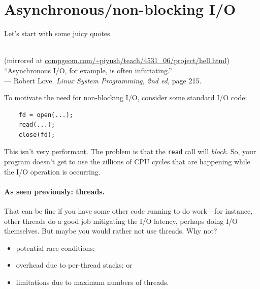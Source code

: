 




\section*{Asynchronous/non-blocking I/O}

Let's start with some juicy quotes.

\begin{center}
  \\
{\scriptsize (mirrored at \url{compgeom.com/~piyush/teach/4531_06/project/hell.html})}
   \\[2em]

   ``Asynchronous I/O, for example, is often infuriating.''\\
\hfill --- Robert Love. {\em Linux System Programming, 2nd ed, } page 215.

\end{center}

To motivate the need for non-blocking I/O, consider some standard I/O code:

\begin{verbatim}
    fd = open(...);
    read(...);
    close(fd);
\end{verbatim}

This isn't very performant. The problem is that the {\tt read} call will
{\em block}. So, your program doesn't get to use the zillions of CPU cycles that
are happening while the I/O operation is occurring.

\paragraph{As seen previously: threads.} That can be fine if
you have some other code running to do work---for instance, other threads
do a good job mitigating the I/O latency, perhaps doing I/O themselves.
But maybe you would rather not use threads. Why not?

\begin{itemize}
\item potential race conditions;
\item overhead due to per-thread stacks; or
\item limitations due to maximum numbers of threads.
\end{itemize}

